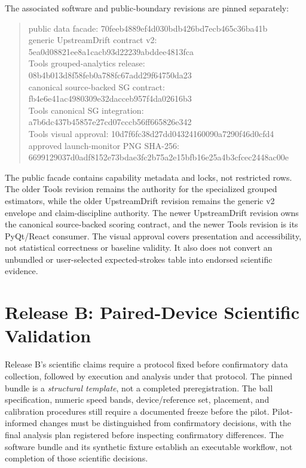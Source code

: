 The associated software and public-boundary revisions are pinned separately:
\begin{quote}
\small\ttfamily
public data facade: 70feeb4889ef4d030bdb426bd7ecb465c36ba41b\\
generic UpstreamDrift contract v2: 5ea0d08821ee8a1cacb93d22239abddee4813fca\\
Tools grouped-analytics release: 08b4b013d8f58feb0a788fc67add29f64750da23\\
canonical source-backed SG contract: fb4e6e41ac4980309e32dacceb957f4da02616b3\\
Tools canonical SG integration: a7b6dc437b45857e27cd07cccb56ff665826e342\\
Tools visual approval: 10d7f6fc38d27dd04324160090a7290f46d0cfd4\\
approved launch-monitor PNG SHA-256:\\
6699129037d0adf8152e73bdae3fc2b7\allowbreak{}5a2e15bfb16e25a4b3cfcec2448ac00e
\end{quote}
The public facade contains capability metadata and locks, not restricted rows.
The older Tools revision remains the authority for the specialized grouped
estimators, while the older UpstreamDrift revision remains the generic v2
envelope and claim-discipline authority. The newer UpstreamDrift revision owns
the canonical source-backed scoring contract, and the newer Tools revision is
its PyQt/React consumer. The visual approval covers presentation and accessibility,
not statistical correctness or baseline validity. It also does not convert an
unbundled or user-selected expected-strokes table into endorsed scientific
evidence.

\section{Release B: Paired-Device Scientific Validation}

Release B's scientific claims require a protocol fixed before confirmatory data collection, followed by execution and analysis under that protocol.
The pinned bundle is a \emph{structural template}, not a completed preregistration.
The ball specification, numeric speed bands, device/reference set, placement, and calibration procedures still require a documented freeze before the pilot.
Pilot-informed changes must be distinguished from confirmatory decisions, with the final analysis plan registered before inspecting confirmatory differences.
The software bundle and its synthetic fixture establish an executable workflow, not completion of those scientific decisions.

